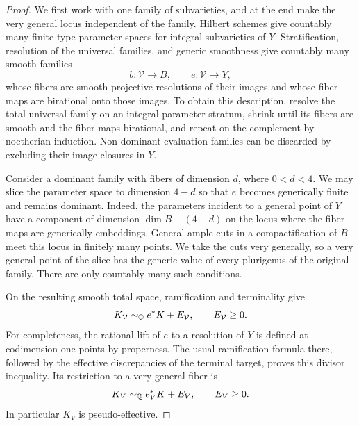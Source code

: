 \begin{proof}
We first work with one family of subvarieties, and at the end make the
very general locus independent of the family.  Hilbert schemes give
countably many finite-type parameter spaces for integral subvarieties
of $Y$.  Stratification, resolution of the universal families, and
generic smoothness give countably many smooth families
\[
 b:\mathcal V\longrightarrow B,\qquad e:\mathcal V\longrightarrow Y,
\]
whose fibers are smooth projective resolutions of their images and
whose fiber maps are birational onto those images.  To obtain this
description, resolve the total universal family on an integral
parameter stratum, shrink until its fibers are smooth and the fiber
maps birational, and repeat on the complement by noetherian
induction.  Non-dominant evaluation families can be discarded by
excluding their image closures in $Y$.

Consider a dominant family with fibers of dimension $d$, where
$0<d<4$.  We may slice the parameter space to dimension $4-d$ so
that $e$ becomes generically finite and remains dominant.  Indeed, the
parameters incident to a general point of $Y$ have a component of
dimension $\dim B-(4-d)$ on the locus where the fiber maps are
generically embeddings.  General ample cuts in a compactification of
$B$ meet this locus in finitely many points.  We take the cuts very
generally, so a very general point of the slice has the generic value
of every plurigenus of the original family.  There are only countably
many such conditions.

On the resulting smooth total space, ramification and terminality
give
\[
 K_{\mathcal V}\sim_\mathbb Q e^*K+E_{\mathcal V},\qquad E_{\mathcal V}\ge0.
\]
For completeness, the rational lift of $e$ to a resolution of $Y$ is
defined at codimension-one points by properness.  The usual
ramification formula there, followed by the effective discrepancies
of the terminal target, proves this divisor inequality.  Its
restriction to a very general fiber is
\begin{equation}\label{eq:fiber-canonical-comparison}
 K_V\sim_\mathbb Q e_V^*K+E_V,\qquad E_V\ge0.
\end{equation}
In particular $K_V$ is pseudo-effective.


\end{proof}
